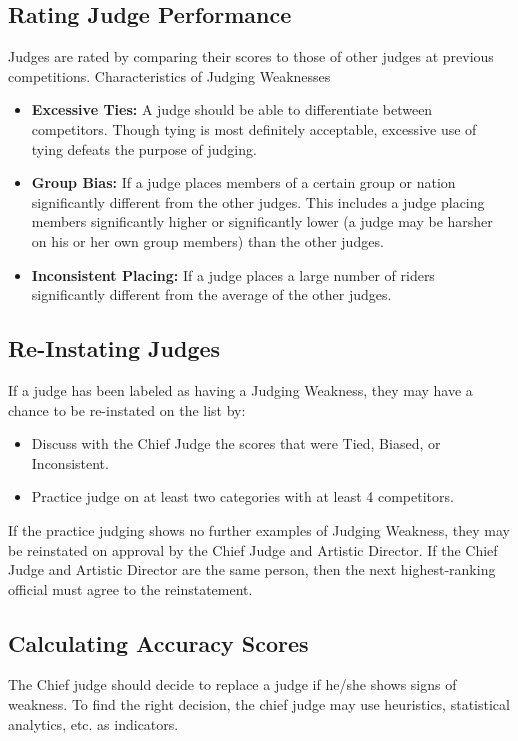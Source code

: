 \subsection{Rating Judge Performance  \label{subsec:freestyle_judging-panel_rating-judge-performance}}
Judges are rated by comparing their scores to those of other judges at previous competitions.
Characteristics of Judging Weaknesses
\begin{itemize}
\item \textbf{Excessive Ties:} A judge should be able to differentiate between competitors.
Though tying is most definitely acceptable, excessive use of tying defeats the purpose of judging.
\item \textbf{Group Bias:} If a judge places members of a certain group or nation significantly different from the other judges.
This includes a judge placing members significantly higher or significantly lower (a judge may be harsher on his or her own group members) than the other judges.
\item \textbf{Inconsistent Placing:} If a judge places a large number of riders significantly different from the average of the other judges.
\end{itemize}

\subsection{Re-Instating Judges}
If a judge has been labeled as having a Judging Weakness, they may have a chance to be re-instated on the list by:
\begin{itemize}
\item Discuss with the Chief Judge the scores that were Tied, Biased, or Inconsistent.
\item Practice judge on at least two categories with at least 4 competitors.
\end{itemize}
If the practice judging shows no further examples of Judging Weakness, they may be reinstated on approval by the Chief Judge and Artistic Director.
If the Chief Judge and Artistic Director are the same person, then the next highest-ranking official must agree to the reinstatement.

\subsection{Calculating Accuracy Scores \label{subsec:freestyle_judging-panel_calculating-accuracy-scores}}
The Chief judge should decide to replace a judge if he/she shows signs of weakness.
To find the right decision, the chief judge may use heuristics, statistical analytics, etc. as indicators.

